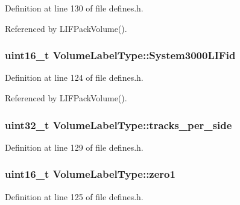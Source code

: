 Definition at line 130 of file defines.\+h.



Referenced by L\+I\+F\+Pack\+Volume().

\subsubsection[{\texorpdfstring{System3000\+L\+I\+Fid}{System3000LIFid}}]{\setlength{\rightskip}{0pt plus 5cm}uint16\+\_\+t Volume\+Label\+Type\+::\+System3000\+L\+I\+Fid}\hypertarget{structVolumeLabelType_a08ea76c4d6e860804d6cfd24174d301f}{}\label{structVolumeLabelType_a08ea76c4d6e860804d6cfd24174d301f}


Definition at line 124 of file defines.\+h.



Referenced by L\+I\+F\+Pack\+Volume().

\subsubsection[{\texorpdfstring{tracks\+\_\+per\+\_\+side}{tracks_per_side}}]{\setlength{\rightskip}{0pt plus 5cm}uint32\+\_\+t Volume\+Label\+Type\+::tracks\+\_\+per\+\_\+side}\hypertarget{structVolumeLabelType_a590051c8debbe3d157761235c0e80d79}{}\label{structVolumeLabelType_a590051c8debbe3d157761235c0e80d79}


Definition at line 129 of file defines.\+h.

\subsubsection[{\texorpdfstring{zero1}{zero1}}]{\setlength{\rightskip}{0pt plus 5cm}uint16\+\_\+t Volume\+Label\+Type\+::zero1}\hypertarget{structVolumeLabelType_a741f3741367c9c73ba24d15ac0b0e3a4}{}\label{structVolumeLabelType_a741f3741367c9c73ba24d15ac0b0e3a4}


Definition at line 125 of file defines.\+h.




